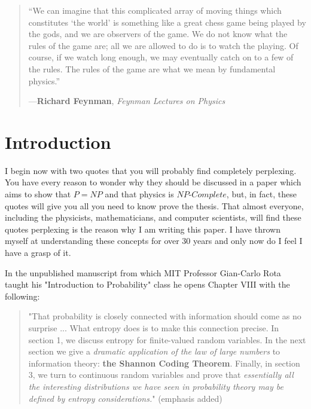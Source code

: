 \documentclass{report}
\makeatletter
\renewcommand\part{\if@openright\clearpage\else\clearpage\fi
  \thispagestyle{plain}%
  \if@twocolumn
    \onecolumn
    \@tempswatrue
  \else
    \@tempswafalse
  \fi
  \null\vfil
  \secdef\@part\@spart}
\makeatother
\begin{document}
\part{The Entropy Game}
\begin{quote}
    ``We can imagine that this complicated array of moving things which constitutes ‘the world’ is 
    something like a great chess game being played by the gods, and we are observers of the game. We 
    do not know what the rules of the game are; all we are allowed to do is to watch the playing. Of 
    course, if we watch long enough, we may eventually catch on to a few of the rules. The rules of 
    the game are what we mean by fundamental physics.''
    
    ---\textbf{Richard Feynman}, \emph{Feynman Lectures on Physics}\cite{FeynmanGameRules}
    \end{quote}

\section*{Introduction}
I begin now with two quotes that you will probably find completely perplexing. You have every reason to wonder why they should be discussed in a paper which aims to show that $P=NP$ and that physics is $NP\text{-}Complete$, but, in fact, these quotes will give you all you need to know prove the thesis. That almost everyone, including the physicists, mathematicians, and computer scientists, will find these quotes perplexing is the reason why I am writing this paper. I have thrown myself at understanding these concepts for over 30 years and only now do I feel I have a grasp of it.

In the unpublished manuscript from which MIT Professor Gian-Carlo Rota taught his "Introduction to Probability" class he opens Chapter VIII with the following:

\begin{quote}
    "That probability is closely connected with information should come as no surprise ... What entropy does is to make this connection precise. In section 1, we discuss entropy for finite-valued random variables. In the next section we give a \emph{dramatic application of the law of large numbers} to information theory: \textbf{the Shannon Coding Theorem}. Finally, in section 3, we turn to continuous random variables and prove that \emph{essentially all the interesting distributions we have seen in probability theory may be defined by entropy considerations.}"\cite{RotaBaclawski} (emphasis added)
\end{quote}
\end{document}
